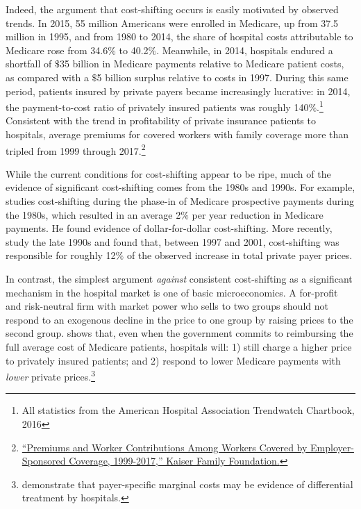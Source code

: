 \documentclass[12pt]{article}
\begin{document}
Indeed, the argument that cost-shifting occurs is easily motivated by observed trends.  In 2015, 55 million Americans were enrolled in Medicare, up from 37.5 million in 1995, and from 1980 to 2014, the share of hospital costs attributable to Medicare rose from 34.6$\%$ to 40.2$\%$.  Meanwhile, in 2014, hospitals endured a shortfall of $\$$35 billion in Medicare payments relative to Medicare patient costs, as compared with a $\$$5 billion surplus relative to costs in 1997.  During this same period, patients insured by private payers became increasingly lucrative: in 2014, the payment-to-cost ratio of privately insured patients was roughly 140$\%$.\footnote{All statistics from the American Hospital Association Trendwatch Chartbook, 2016} Consistent with the trend in profitability of private insurance patients to hospitals, average premiums for covered workers with family coverage more than tripled from 1999 through 2017.\footnote{\href{https://www.kff.org/interactive/premiums-and-worker-contributions/?coverageGroup=family}{``Premiums and Worker Contributions Among Workers Covered by Employer-Sponsored Coverage, 1999-2017,'' Kaiser Family Foundation.}}

While the current conditions for cost-shifting appear to be ripe, much of the evidence of significant cost-shifting comes from the 1980s and 1990s.  For example, \cite{cutler1998costshift} studies cost-shifting during the phase-in of Medicare prospective payments during the 1980s, which resulted in an average 2$\%$ per year reduction in Medicare payments.  He found evidence of dollar-for-dollar cost-shifting.  More recently, \cite{zwanziger2006} study the late 1990s and found that, between 1997 and 2001, cost-shifting was responsible for roughly 12$\%$ of the observed increase in total private payer prices.

In contrast, the simplest argument \textit{against} consistent cost-shifting as a significant mechanism in the hospital market is one of basic microeconomics.  A for-profit and risk-neutral firm with market power who sells to two groups should not respond to an exogenous decline in the price to one group by raising prices to the second group.  \cite{hay1983} shows that, even when the government commits to reimbursing the full average cost of Medicare patients, hospitals will: 1) still charge a higher price to privately insured patients; and 2) respond to lower Medicare payments with \textit{lower} private prices.\footnote{\cite{dor1996} demonstrate that payer-specific marginal costs may be evidence of differential treatment by hospitals.}
\end{document}
